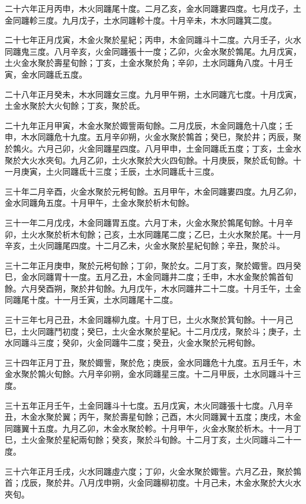 \begin{pinyinscope}
二十六年正月丙申，木火同躔尾十度。二月乙亥，金水同躔婁四度。七月戊子，土金同躔軫三度。九月戊子，土水同躔軫十度。十月辛未，木水同躔箕二度。

二十七年正月戊寅，木金火聚於星紀；丙申，木金同躔斗十二度。六月壬子，火水同躔鬼三度。八月辛亥，火金同躔張十一度；乙卯，火金水聚於鶉尾。九月戊寅，土火金水聚於壽星旬餘；丁亥，土金水聚於角；辛卯，土水同躔角八度。十月壬寅，金水同躔氐五度。

二十八年正月癸未，木水同躔女三度。九月甲午朔，土水同躔亢七度。十月戊寅，土金水聚於大火旬餘；丁亥，聚於氐。

二十九年正月甲寅，木金水聚於娵訾兩旬餘。二月戊辰，木金同躔危十八度；壬申，木水同躔危十九度。五月辛卯朔，火金水聚於鶉首；癸巳，聚於井；丙辰，聚於鶉火。六月己卯，火金同躔星四度。八月甲申，土金同躔氐五度；丁亥，土金水聚於大火水夾旬。九月乙卯，土火水聚於大火四旬餘。十月庚辰，聚於氐旬餘。十一月庚寅，土火同躔氐十三度；壬辰，土水同躔氐十三度。

三十年二月辛酉，火金水聚於元枵旬餘。五月甲午，木金同躔婁四度。九月乙卯，金水同躔角五度。十月甲午，土金水聚於析木旬餘。

三十一年二月戊戌，木金同躔胃五度。六月丁未，火金水聚於鶉尾旬餘。十月辛卯，土火水聚於析木旬餘；己亥，土水同躔尾二度；乙巳，土火水聚於尾。十一月辛亥，土火同躔尾四度。十二月乙未，火金水聚於星紀旬餘；辛丑，聚於斗。

三十二年正月庚申，聚於元枵旬餘；丁卯，聚於女。二月丁亥，聚於娵訾。四月癸巳，金水同躔胃十一度。五月乙丑，木金同躔井二度；壬申，木水金聚於鶉首旬餘。六月癸酉朔，聚於井旬餘。九月戊午，木水同躔井二十二度。十月壬午，土金同躔尾十度。十一月壬寅，土水同躔尾十二度。

三十三年七月己丑，木金同躔柳九度。十月丁巳，土火水聚於箕旬餘。十一月己巳，土火同躔鬥初度；癸巳，土火金水聚於星紀。十二月戊戌，聚於斗；庚子，土水同躔斗三度；癸卯，火金同躔牛二度；癸丑，火金水聚於元枵旬餘。

三十四年正月丁丑，聚於娵訾，聚於危；庚辰，金水同躔危十九度。五月壬午，木金水聚於鶉火旬餘。六月辛卯朔，金水同躔星三度。十二月甲辰，土水同躔斗十三度。

三十五年正月壬午，土金同躔斗十七度。五月戊寅，木火同躔張十七度。八月辛丑，木金水聚於翼；丙午，聚於壽星旬餘；己酉，木火同躔翼十五度；庚戌，木金同躔翼十五度。九月乙卯，木金水聚於軫。十月甲午，火金水聚於析木。十一月丁巳，土火金聚於星紀兩旬餘；癸亥，聚於斗旬餘。十二月丁亥，土火同躔斗二十一度。

三十六年正月壬戌，火水同躔虛六度；丁卯，火金水聚於娵訾。六月乙丑，聚於鶉首；戊辰，聚於井。八月戊申朔，火金同躔柳初度。十月己未，木金水聚於大火水夾旬。


\end{pinyinscope}
